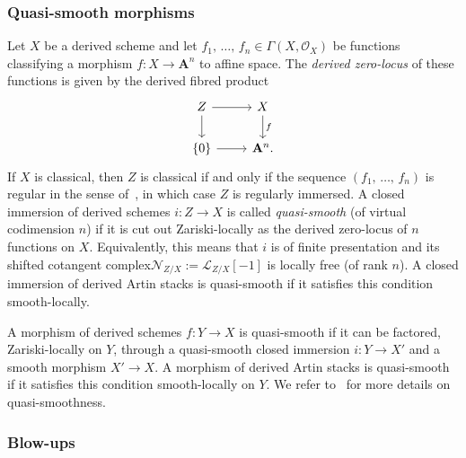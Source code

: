 \documentclass[11pt]{article}
\theoremstyle{definition}
\numberwithin{equation}{section}
\numberwithin{figure}{section}
\numberwithin{table}{section}
\newcommand{\sL}{\ensuremath{\mathcal{L}}\xspace}
\newcommand{\sN}{\ensuremath{\mathcal{N}}\xspace}
\newcommand{\sO}{\ensuremath{\mathcal{O}}\xspace}
\newcommand{\bA}{\ensuremath{\mathbf{A}}\xspace}
\newcommand{\A}{\bA}
\begin{document}
\subsubsection{Quasi-smooth morphisms}
Let $X$ be a derived scheme and let $f_1,\,\ldots,\,f_n \in \Gamma(X, \sO_X)$ be functions classifying a morphism $f : X \to \A^n$ to affine space. The \emph{derived zero-locus} of these functions is given by the derived fibred product
\begin{equation}\label{eq:quasi-smooth}
\begin{tikzcd}
Z \ar{r}\ar{d} & X \ar{d}{f}
\\
\{0\} \ar{r} & \A^n.
\end{tikzcd}
\end{equation}
If $X$ is classical, then $Z$ is classical if and only if the sequence $(f_1,\,\ldots,\,f_n)$ is regular in the sense of~\cite{SGA6}, in which case $Z$ is regularly immersed. A closed immersion of derived schemes $i : Z \to X$ is called \emph{quasi-smooth} (of virtual codimension $n$) if it is cut out Zariski-locally as the derived zero-locus of $n$ functions on $X$. Equivalently, this means that $i$ is of finite presentation and its shifted cotangent complex\linebreak$\sN_{Z/X}:= \sL_{Z/X}[-1]$ is locally free (of rank $n$). A closed immersion of derived Artin stacks is quasi-smooth if it satisfies this condition smooth-locally.

A morphism of derived schemes $f : Y \to X$ is quasi-smooth if it can be factored, Zariski-locally on $Y$, through a quasi-smooth closed immersion $i : Y \to X'$ and a smooth morphism $X' \to X$. A morphism of derived Artin stacks is quasi-smooth if it satisfies this condition smooth-locally on $Y$. We refer to~\cite{KhanBlowup} for more details on quasi-smoothness.

\subsubsection{Blow-ups}
\end{document}
